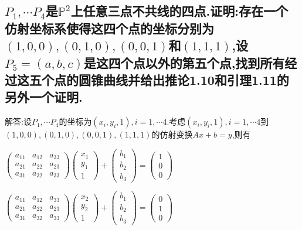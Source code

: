 \documentclass[UTF8]{book}
\begin{document}
		\subsection{$ P_{1},\cdots P_{4} $是$ \mathbb{P}^{2} $上任意三点不共线的四点.证明:存在一个仿射坐标系使得这四个点的坐标分别为$ (1,0,0),(0,1,0),(0,0,1) $和$ (1,1,1) $,设$ P_{5} = (a,b,c)$是这四个点以外的第五个点,找到所有经过这五个点的圆锥曲线并给出推论1.10和引理1.11的另外一个证明.}
		
			解答:设$ P_{1},\cdots P_{4} $的坐标为$ (x_{i},y_{i},1) ,i = 1,\cdots 4$.考虑$ (x_{i},y_{i},1) ,i = 1,\cdots 4$到$ (1,0,0),(0,1,0),(0,0,1),(1,1,1) $的仿射变换$ Ax +b = y $,则有
			
			
			$\left(\begin{array}{lll}{a_{11}} & {a_{12}} & {a_{33}} \\ {a_{21}} & {a_{22}} & {a_{23}} \\ {a_{31}} & {a_{32}} & {a_{33}}\end{array}\right)\left(\begin{array}{l}{x_{1}} \\ {y_{1}} \\ 1\end{array}\right)+\left(\begin{array}{l}{b_{1}} \\ {b_{2}} \\ {b_{3}}\end{array}\right)=\left(\begin{array}{c}{1} \\ {0} \\ {0}\end{array}\right)$
			
			
			$\left(\begin{array}{lll}{a_{11}} & {a_{12}} & {a_{33}} \\ {a_{21}} & {a_{22}} & {a_{23}} \\ {a_{31}} & {a_{32}} & {a_{33}}\end{array}\right)\left(\begin{array}{l}{x_{2}} \\ {y_{2}} \\ 1\end{array}\right)+\left(\begin{array}{l}{b_{1}} \\ {b_{2}} \\ {b_{3}}\end{array}\right)=\left(\begin{array}{c}{0} \\ {1} \\ {0}\end{array}\right)$
			
\end{document}
